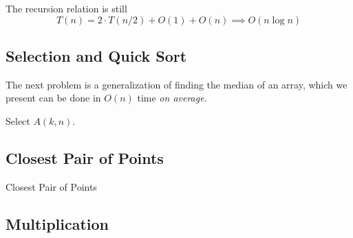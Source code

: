 \documentclass{article}
\begin{document}
\begin{algo}
\begin{algorithm}[H]
\begin{algorithmic}
            \State {}
          \EndFunction
        \end{algorithmic}
      \end{algorithm}
      The recursion relation is still 
      \begin{equation}
        T(n) = 2 \cdot T(n/2) + O(1) + O(n) \implies O(n \log{n})
      \end{equation}
    \end{algo}

  \subsection{Selection and Quick Sort}  
  
    The next problem is a generalization of finding the median of an array, which we present can be done in $O(n)$ time \textit{on average}. 
    
    \begin{algo}

      \begin{algorithm}[H]
        \caption{Select $A(k, n)$. }
        \label{alg:selection}
        \begin{algorithmic}
          \Require{}
          \State 
          \EndFunction
        \end{algorithmic}
      \end{algorithm}
    \end{algo}

  \subsection{Closest Pair of Points} 

    \begin{algo}
      
      \begin{algorithm}[H]
        \caption{Closest Pair of Points}
        \label{alg:closest_pair}
        \begin{algorithmic}
          \State 
          \EndFunction
        \end{algorithmic}
      \end{algorithm}
    \end{algo}

  \subsection{Multiplication}
\end{document}
